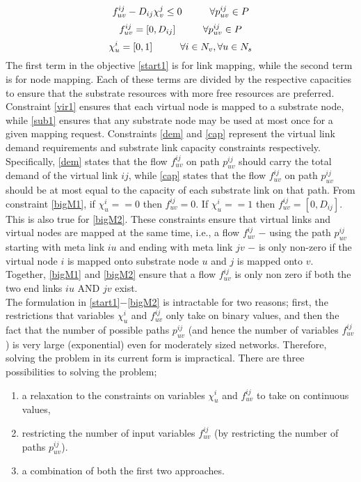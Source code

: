 \documentclass[journal]{IEEEtran}
\begin{document}
\begin{equation}
{f_{uv}^{ij}} - D_{ij} \chi_{v}^{j}\leq 0\hspace{10 mm}\forall p_{uv}^{ij} \in P
\label{bigM2}
\end{equation}
$$f_{uv}^{ij} = [0, D_{ij}] \hspace{10 mm} \forall p_{uv}^{ij} \in P$$
$$\chi_{u}^{i} = [0,1] \hspace{10 mm} \forall i \in N_v, \forall u \in N_s$$
\indent The first term in the objective \eqref{start1} is for link mapping, while the second term is for node mapping. Each of these terms are divided by the respective capacities to ensure that the substrate resources with more free resources are preferred. Constraint \eqref{vir1} ensures that each virtual node is mapped to a substrate node, while \eqref{sub1} ensures that any substrate node may be used at most once for a given mapping request. Constraints \eqref{dem} and \eqref{cap} represent the virtual link demand requirements and substrate link capacity constraints respectively. Specifically, \eqref{dem} states that the flow $f_{uv}^{ij}$ on path $p_{uv}^{ij}$ should carry the total demand of the virtual link $ij$, while \eqref{cap} states that the flow $f_{uv}^{ij}$ on path $p_{uv}^{ij}$ should be at most equal to the capacity of each substrate link on that path. From constraint \eqref{bigM1}, if $\chi_{u}^{i} == 0$ then $f_{uv}^{ij} = 0$. If $\chi_{u}^{i} == 1$ then $f_{uv}^{ij} = [0, D_{ij}]$. This is also true for \eqref{bigM2}. These constraints ensure that virtual links and virtual nodes are mapped at the same time, i.e., a flow $f_{uv}^{ij}$ $-$ using the path $p_{uv}^{ij}$ starting with meta link $iu$ and ending with meta link  $jv$ $-$ is only non-zero if the virtual node $i$ is mapped onto substrate node $u$ and $j$ is mapped onto $v$. Together, \eqref{bigM1} and \eqref{bigM2} ensure that a flow $f_{uv}^{ij}$ is only non zero if both the two end links $iu$ AND $jv$ exist.\\
\indent The formulation in \eqref{start1}$-$\eqref{bigM2} is intractable for two reasons; first, the restrictions that variables $\chi_{u}^{i}$ and $f_{uv}^{ij}$ only take on binary values, and then the fact that the number of possible paths $p_{uv}^{ij}$ (and hence the number of variables $f_{uv}^{ij}$) is very large (exponential) even for moderately sized networks. Therefore, solving the problem in its current form is impractical. There are three possibilities to solving the problem;
\begin{enumerate}
\item a relaxation to the constraints on variables $\chi_{u}^{i}$ and $f_{uv}^{ij}$ to take on continuous values,
\item restricting the number of input variables $f_{uv}^{ij}$ (by restricting the number of paths $p_{uv}^{ij}$).
\item a combination of both the first two approaches.
\end{enumerate}
\end{document}
